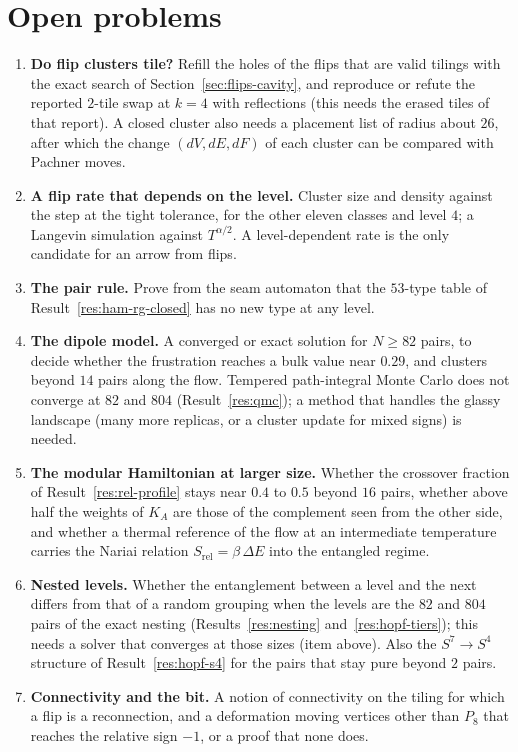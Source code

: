\documentclass[11pt]{article}
\theoremstyle{definition}
\begin{document}
\section{Open problems}\label{sec:open}
\begin{enumerate}[leftmargin=1.6em,itemsep=1pt]
\item \textbf{Do flip clusters tile?} Refill the holes of the flips that are valid tilings with the exact search of Section~\ref{sec:flips-cavity}, and reproduce or refute the reported $2$-tile swap at $k=4$ with reflections (this needs the erased tiles of that report). A closed cluster also needs a placement list of radius about $26$, after which the change $(dV,dE,dF)$ of each cluster can be compared with Pachner moves.
\item \textbf{A flip rate that depends on the level.} Cluster size and density against the step at the tight tolerance, for the other eleven classes and level $4$; a Langevin simulation against $T^{\alpha/2}$. A level-dependent rate is the only candidate for an arrow from flips.
\item \textbf{The pair rule.} Prove from the seam automaton that the $53$-type table of Result~\ref{res:ham-rg-closed} has no new type at any level.
\item \textbf{The dipole model.} A converged or exact solution for $N\ge82$ pairs, to decide whether the frustration reaches a bulk value near $0.29$, and clusters beyond $14$ pairs along the flow. Tempered path-integral Monte Carlo does not converge at $82$ and $804$ (Result~\ref{res:qmc}); a method that handles the glassy landscape (many more replicas, or a cluster update for mixed signs) is needed.
\item \textbf{The modular Hamiltonian at larger size.} Whether the crossover fraction of Result~\ref{res:rel-profile} stays near $0.4$ to $0.5$ beyond $16$ pairs, whether above half the weights of $K_A$ are those of the complement seen from the other side, and whether a thermal reference of the flow at an intermediate temperature carries the Nariai relation $S_{\mathrm{rel}}=\beta\,\Delta E$ into the entangled regime.
\item \textbf{Nested levels.} Whether the entanglement between a level and the next differs from that of a random grouping when the levels are the $82$ and $804$ pairs of the exact nesting (Results~\ref{res:nesting} and~\ref{res:hopf-tiers}); this needs a solver that converges at those sizes (item above). Also the $S^7\to S^4$ structure of Result~\ref{res:hopf-s4} for the pairs that stay pure beyond $2$ pairs.
\item \textbf{Connectivity and the bit.} A notion of connectivity on the tiling for which a flip is a reconnection, and a deformation moving vertices other than $P_8$ that reaches the relative sign $-1$, or a proof that none does.
\end{enumerate}
\end{document}

